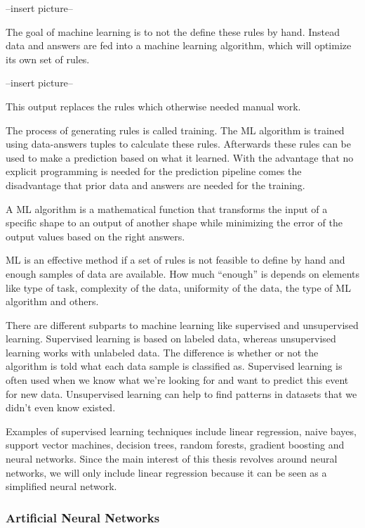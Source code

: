 --insert picture--

The goal of machine learning is to not the define these rules by hand. Instead data and answers are fed into a machine learning algorithm, which will optimize its own set of rules.

--insert picture--

This output replaces the rules which otherwise needed manual work.

The process of generating rules is called training. The ML algorithm is trained using data-answers tuples to calculate these rules. Afterwards these rules can be used to make a prediction based on what it learned. With the advantage that no explicit programming is needed for the prediction pipeline comes the disadvantage that prior data and answers are needed for the training.

A ML algorithm is a mathematical function that transforms the input of a specific shape to an output of another shape while minimizing the error of the output values based on the right answers.

ML is an effective method if a set of rules is not feasible to define by hand and enough samples of data are available. How much “enough” is depends on elements like type of task, complexity of the data, uniformity of the data, the type of ML algorithm and others.

There are different subparts to machine learning like supervised and unsupervised learning. Supervised learning is based on labeled data, whereas unsupervised learning works with unlabeled data. The difference is whether or not the algorithm is told what each data sample is classified as. Supervised learning is often used when we know what we’re looking for and want to predict this event for new data. Unsupervised learning can help to find patterns in datasets that we didn’t even know existed.

Examples of supervised learning techniques include linear regression, naive bayes, support vector machines, decision trees, random forests, gradient boosting and neural networks. Since the main interest of this thesis revolves around neural networks, we will only include linear regression because it can be seen as a simplified neural network.




\subsubsection{Artificial Neural Networks}


